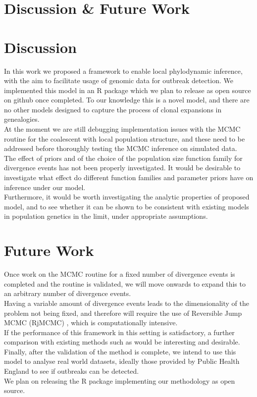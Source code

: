 \documentclass{ieeeaccess}
\theoremstyle{definition}
\begin{document}
\section{Discussion \& Future Work}
\section{Discussion}
In this work we proposed a framework to enable local phylodynamic inference, with the aim to facilitate usage of genomic data for outbreak detection.
We implemented this model in an R package which we plan to release as open source on github once completed. To our knowledge this is a novel model, and there are no other models designed to capture the process of clonal expansions in genealogies.\\
At the moment we are still debugging implementation issues with the MCMC routine for the coalescent with local population structure, and these need to be addressed before thoroughly testing the MCMC inference on simulated data.\\ 
The effect of priors and of the choice of the population size function family for divergence events has not been properly investigated. It would be desirable to investigate what effect do different function families and parameter priors have on inference under our model.\\
Furthermore, it would be worth investigating the analytic properties of proposed model, and to see whether it can be shown to be consistent with existing models in population genetics in the limit, under appropriate assumptions.\\ 
\section{Future Work}
Once work on the MCMC routine for a fixed number of divergence events is completed and the routine is validated, we will move onwards to expand this to an arbitrary number of divergence events.\\
Having a variable amount of divergence events leads to the dimensionality of the problem not being fixed, and therefore will require the use of Reversible Jump MCMC (RjMCMC) \cite{green_reversible_1995, fan_reversible_2010}, which is computationally intensive.\\
If the performance of this framework in this setting is satisfactory, a further comparison with existing methods such as \cite{volz_identification_nodate,barido-sottani_multitype_2020} would be interesting and desirable.\\
Finally, after the validation of the method is complete, we intend to use this model to analyse real world datasets, ideally those provided by Public Health England to see if outbreaks can be detected.\\
We plan on releasing the R package implementing our methodology as open source. 
\begin{thebibliography}{00}
\printbibliography
\end{thebibliography}
\EOD
\end{document}
